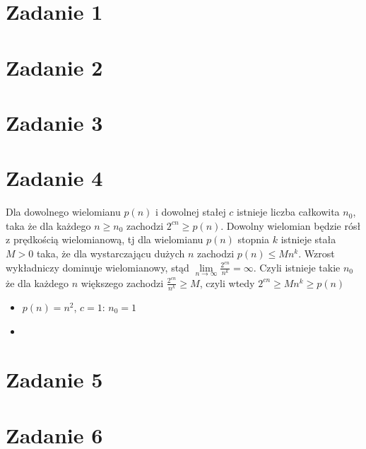 \documentclass{article}
\begin{document}
\section{Zadanie 1}
\section{Zadanie 2}
\section{Zadanie 3}
\section{Zadanie 4}
Dla dowolnego wielomianu $p(n)$ i dowolnej stałej $c$ istnieje liczba całkowita $n_0$, taka że dla każdego $n \ge n_0$ zachodzi $2^{cn} \ge p(n)$.
Dowolny wielomian będzie rósł z prędkością wielomianową, tj dla wielomianu $p(n)$ stopnia $k$ istnieje stała $M > 0$ taka, że dla wystarczającu dużych $n$ zachodzi $p(n) \leq Mn^k$.
Wzrost wykładniczy dominuje wielomianowy, stąd $\lim\limits_{n\rightarrow\infty}\frac{2^{cn}}{n^k}=\infty$. Czyli istnieje takie $n_0$ że dla każdego $n$ większego zachodzi $\frac{2^{cn}}{n^k} \geq M$, czyli wtedy $2^{cn} \geq Mn^k \geq p(n)$
\begin{itemize}
  \item $p(n) = n^2$, $c=1$: $n_0=1$
  \item
\end{itemize}
\section{Zadanie 5}
\section{Zadanie 6}
\end{document}

